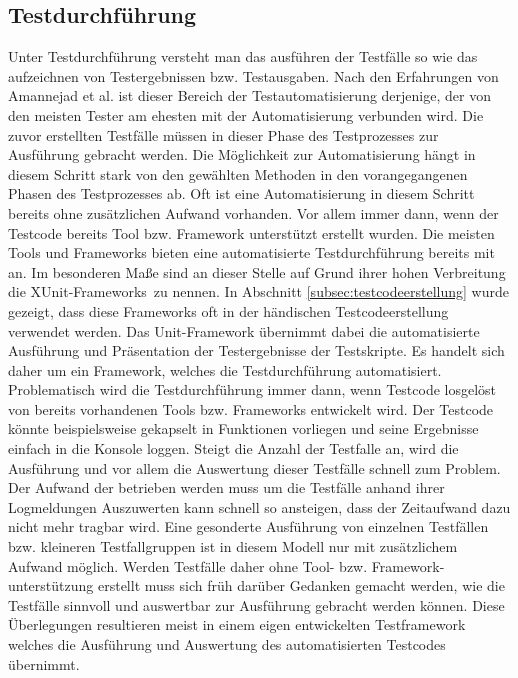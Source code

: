 \subsection{Testdurchführung}
\label{subsec:testdurchführung}
Unter Testdurchführung versteht man das ausführen der Testfälle so wie das aufzeichnen von Testergebnissen bzw. Testausgaben. Nach den Erfahrungen von  Amannejad et al. \cite{amannejad_search-based_2014} ist dieser Bereich der Testautomatisierung derjenige, der von den meisten Tester am ehesten mit der Automatisierung verbunden wird.
Die zuvor erstellten Testfälle müssen in dieser Phase des Testprozesses zur Ausführung gebracht werden. Die Möglichkeit zur Automatisierung hängt in diesem Schritt stark von den gewählten Methoden in den vorangegangenen Phasen des Testprozesses ab. Oft ist eine Automatisierung in diesem Schritt bereits ohne zusätzlichen Aufwand vorhanden. Vor allem immer dann, wenn der Testcode bereits Tool bzw. Framework unterstützt erstellt wurden.
Die meisten Tools und Frameworks bieten eine automatisierte Testdurchführung bereits mit an.
Im besonderen Maße sind an dieser Stelle auf Grund ihrer hohen Verbreitung die \grq XUnit-Frameworks\grq\ zu nennen.
In Abschnitt \ref{subsec:testcodeerstellung} wurde gezeigt, dass diese Frameworks oft in der händischen Testcodeerstellung verwendet werden. Das Unit-Framework übernimmt dabei die automatisierte Ausführung und Präsentation der Testergebnisse der Testskripte. Es handelt sich daher um ein Framework, welches die Testdurchführung automatisiert.
Problematisch wird die Testdurchführung immer dann, wenn Testcode losgelöst von bereits vorhandenen Tools bzw. Frameworks entwickelt wird. Der Testcode könnte beispielsweise gekapselt in Funktionen vorliegen und seine Ergebnisse einfach in die Konsole loggen. Steigt die Anzahl der Testfalle an, wird die Ausführung und vor allem die Auswertung dieser Testfälle schnell zum Problem. Der Aufwand der betrieben werden muss um die Testfälle anhand ihrer Logmeldungen Auszuwerten kann schnell so ansteigen, dass der Zeitaufwand dazu nicht mehr tragbar wird. 
Eine gesonderte Ausführung von einzelnen Testfällen bzw. kleineren Testfallgruppen ist in diesem Modell nur mit zusätzlichem Aufwand möglich.
Werden Testfälle daher ohne Tool- bzw. Framework-unterstützung erstellt muss sich früh darüber Gedanken gemacht werden, wie die Testfälle sinnvoll und auswertbar zur Ausführung gebracht werden können.
Diese Überlegungen resultieren meist in einem eigen entwickelten Testframework welches die Ausführung und Auswertung des automatisierten Testcodes übernimmt.


